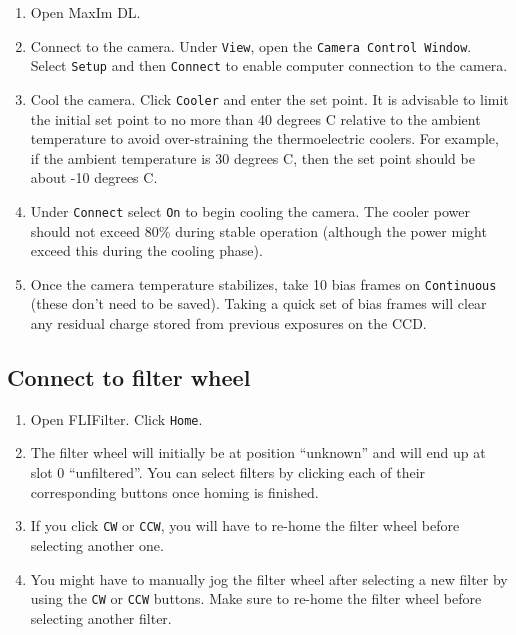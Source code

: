 \documentclass{article}
\begin{document}
	\begin{enumerate}
		
		\item Open MaxIm DL.
		
		\item Connect to the camera. Under \texttt{View}, open the \texttt{Camera Control Window}. Select \texttt{Setup} and then \texttt{Connect} to enable computer connection to the camera.
		
		\item Cool the camera. Click \texttt{Cooler} and enter the set point. It is advisable to limit the initial set point to no more than 40 degrees C relative to the ambient temperature to avoid over-straining the thermoelectric coolers. For example, if the ambient temperature is 30 degrees C, then the set point should be about -10 degrees C.
		
		\item Under \texttt{Connect} select \texttt{On} to begin cooling the camera. The cooler power should not exceed 80\% during stable operation (although the power might exceed this during the cooling phase).
		
		\item Once the camera temperature stabilizes, take 10 bias frames on \texttt{Continuous} (these don't need to be saved). Taking a quick set of bias frames will clear any residual charge stored from previous exposures on the CCD.
		
	\end{enumerate}

	\subsection{Connect to filter wheel}
	\label{sec:connect-to-filter-wheel}
	
	\begin{enumerate}
		
		\item Open FLIFilter. Click \texttt{Home}.
		
		\item The filter wheel will initially be at position ``unknown'' and will end up at slot 0 ``unfiltered''. You can select filters by clicking each of their corresponding buttons once homing is finished.
		
		\item If you click \texttt{CW} or \texttt{CCW}, you will have to re-home the filter wheel before selecting another one.
		
		\item You might have to manually jog the filter wheel after selecting a new filter by using the \texttt{CW} or \texttt{CCW} buttons. Make sure to re-home the filter wheel before selecting another filter.
		
	\end{enumerate}
	
\end{document}
